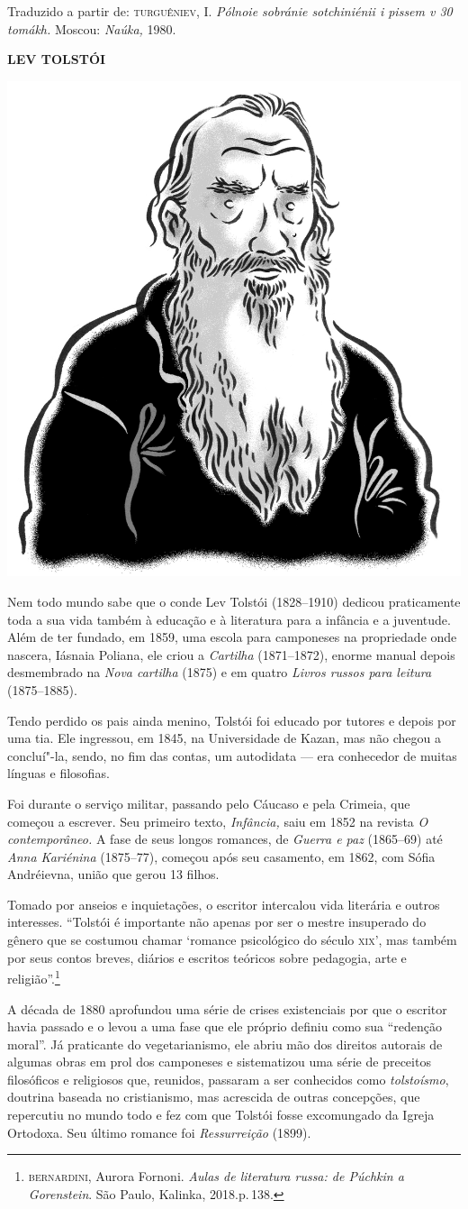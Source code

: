 Traduzido a partir de: \textsc{turguêniev}, I. \emph{Pólnoie sobránie sotchiniénii i pissem v 30
tomákh.} Moscou: \emph{Naúka,} 1980.

\bigskip
\noindent\textbf{LEV TOLSTÓI}\medskip

\noindent\includegraphics[width=.8in]{./imgs/autor4.jpg}

\noindent{}Nem todo mundo sabe que o conde Lev Tolstói (1828--1910) dedicou
praticamente toda a sua vida também à educação e à literatura para a
infância e a juventude. Além de ter fundado, em 1859, uma escola para
camponeses na propriedade onde nascera, Iásnaia Poliana, ele criou a
\emph{Cartilha} (1871--1872), enorme manual depois desmembrado na
\emph{Nova cartilha} (1875) e em quatro \emph{Livros russos para
leitura} (1875--1885).

Tendo perdido os pais ainda menino, Tolstói foi educado por tutores e
depois por uma tia. Ele ingressou, em 1845, na Universidade de Kazan,
mas não chegou a concluí"-la, sendo, no fim das contas, um autodidata ---
era conhecedor de muitas línguas e filosofias.

Foi durante o serviço militar, passando pelo Cáucaso e pela Crimeia, que
começou a escrever. Seu primeiro texto, \emph{Infância,} saiu em 1852 na
revista \emph{O contemporâneo.} A fase de seus longos romances, de
\emph{Guerra e paz} (1865--69) até \emph{Anna Kariénina} (1875--77),
começou após seu casamento, em 1862, com Sófia Andréievna, união que
gerou 13 filhos.

Tomado por anseios e inquietações, o escritor intercalou vida literária
e outros interesses. ``Tolstói é importante não apenas por ser o mestre
insuperado do gênero que se costumou chamar `romance psicológico do
século \textsc{xix}', mas também por seus contos breves, diários e escritos
teóricos sobre pedagogia, arte e religião''.\footnote{\scriptsize\textsc{bernardini}, Aurora Fornoni. \textit{Aulas de literatura russa: de Púchkin a Gorenstein}. São Paulo, Kalinka, 2018.p.\,138.}

A década de 1880 aprofundou uma série de crises existenciais por que o
escritor havia passado e o levou a uma fase que ele próprio definiu como
sua ``redenção moral''. Já praticante do vegetarianismo, ele abriu mão
dos direitos autorais de algumas obras em prol dos camponeses e
sistematizou uma série de preceitos filosóficos e religiosos que,
reunidos, passaram a ser conhecidos como \emph{tolstoísmo}, doutrina
baseada no cristianismo, mas acrescida de outras concepções, que
repercutiu no mundo todo e fez com que Tolstói fosse excomungado da
Igreja Ortodoxa. Seu último romance foi \emph{Ressurreição} (1899).

